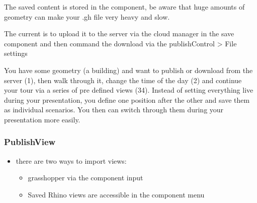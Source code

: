 \documentclass[letterpaper,10pt,english]{sphinxmanual}
\begin{document}
\sphinxAtStartPar
The saved content is stored in the component, be aware that huge amounts of geometry can make your .gh file very heavy and slow.

\sphinxAtStartPar
The current  is to upload it to the server via the cloud manager in the save component and then command the
download via the publishControl \textendash{}\textgreater{} File settings

\sphinxAtStartPar
{}

\sphinxAtStartPar
You have some geometry (a building) and want to publish or download from the server (1), then walk through it, change the time of the day (2) and
continue your tour via a series of pre defined views (3\sphinxhyphen{}4).
Instead of setting everything live during your presentation, you define one position after the other and save
them as individual scenarios. You then can switch through them during your presentation more easily.

\sphinxAtStartPar
{}

\noindent{}

\sphinxAtStartPar
{}

\noindent{}

\sphinxAtStartPar
{}

\noindent{}

\noindent{}

\sphinxstepscope


\subsubsection{PublishView}
\label{\detokenize{tutorial/grashopper/documentation_rst/07_publish_View:publishview}}\label{\detokenize{tutorial/grashopper/documentation_rst/07_publish_View::doc}}
\noindent{}
\begin{itemize}
\item {} 
\sphinxAtStartPar
there are two ways to import views:
\begin{itemize}
\item {} 
\sphinxAtStartPar
grasshopper via the component input

\item {} 
\sphinxAtStartPar
Saved Rhino views are accessible in the component menu

\end{itemize}

\end{itemize}
\end{document}
